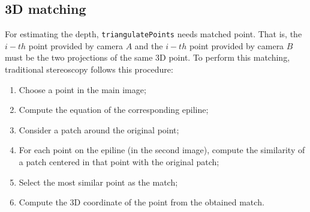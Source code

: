 
\subsection{3D matching}

For estimating the depth, \texttt{triangulatePoints} needs matched point.
That is, the $i{-}th$ point provided by camera $A$ and the $i{-}th$ point provided by camera $B$ must be the two projections of the same 3D point.
To perform this matching, traditional stereoscopy follows this procedure:
\begin{enumerate}
	\itemsep 0em
	\item Choose a point in the main image;
	\item Compute the equation of the corresponding epiline;
	\item Consider a patch around the original point;
	\item For each point on the epiline (in the second image), compute the similarity of a patch centered in that point with the original patch;
	\item Select the most similar point as the match;
	\item Compute the 3D coordinate of the point from the obtained match.
\end{enumerate}
